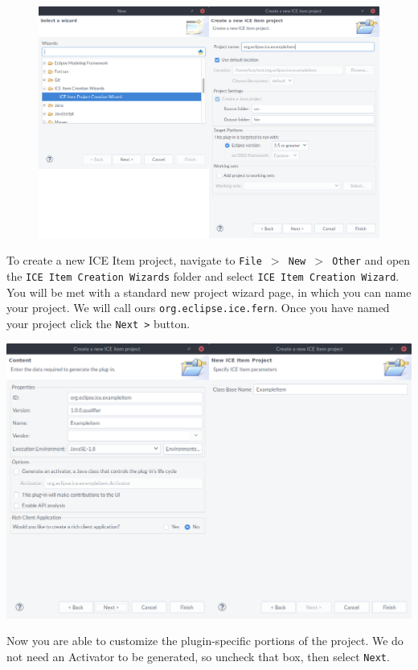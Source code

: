 \begin{figure}[h]
\centering
\includegraphics[width=\textwidth]{figures/comb12.png}
\label{fig:comb12}
\end{figure}

To create a new ICE Item project, navigate to \texttt{File $>$ New $>$ Other}
and open the \texttt{ICE Item Creation Wizards} folder and 
select \texttt{ICE Item Creation Wizard}. You will be met with a standard new
project wizard page, in which you can name your project.  We will call ours
\texttt{org.eclipse.ice.fern}. Once you have named your project click the \texttt{Next >} button.
\begin{center} \includegraphics[width=\textwidth]{figures/comb23} \end{center}
Now you are able to customize the plugin-specific portions of the project. We do
not need an Activator to be generated, so uncheck that box, then select
\texttt{Next}. 

